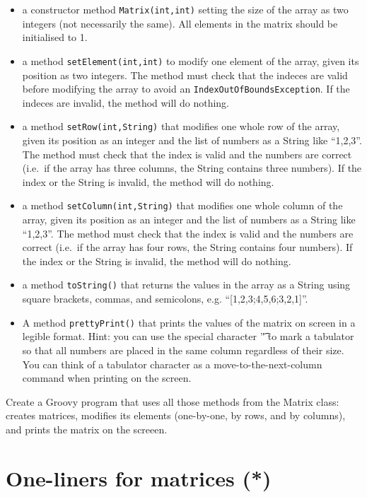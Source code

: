 \documentclass{article}
\begin{document}
\begin{itemize}
\item a constructor method \verb+Matrix(int,int)+ setting the size of
  the array as two 
  integers (not necessarily the same). All elements in the matrix
  should be initialised to 1. 
\item a method \verb+setElement(int,int)+ to modify one element of the
  array, given its position 
  as two integers. The method must check that the indeces are valid
  before modifying the array to avoid an
  \verb+IndexOutOfBoundsException+. If the indeces are invalid, the
  method will do nothing. 
\item a method \verb+setRow(int,String)+ that modifies one whole row
  of the array, given its position 
  as an integer and the list of numbers as a String like ``1,2,3''. 
  The method must check that the index is valid and the numbers are
  correct (i.e.~if the array has three columns, the String contains
  three numbers). If the index or the String is invalid, the
  method will do nothing. 
\item a method \verb+setColumn(int,String)+ that modifies one whole 
  column of the array, given its position 
  as an integer and the list of numbers as a String like ``1,2,3''. 
  The method must check that the index is valid and the numbers are
  correct (i.e.~if the array has four rows, the String contains
  four numbers). If the index or the String is invalid, the
  method will do nothing.
\item a method \verb+toString()+ that returns the values in the array
  as a String using square brackets, commas, and semicolons,
  e.g. ``[1,2,3;4,5,6;3,2,1]''. 
\item A method \verb+prettyPrint()+ that prints the values of the
  matrix on screen in a legible format. Hint: you can use the
  special character '\t' to mark a tabulator so that all numbers are
  placed in the same column regardless of their size. You can think of
  a tabulator character as a move-to-the-next-column command when
  printing on the screen. 
\end{itemize}

Create a Groovy program that uses all those methods from the Matrix class:
creates matrices, modifies its elements (one-by-one, by rows, and by
columns), and prints the matrix on the screeen. 

\section{One-liners for matrices (*)}
\label{sec:creat-matr-one}
\end{document}
